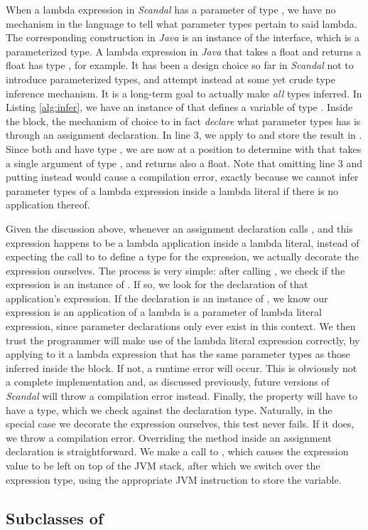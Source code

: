 When a lambda expression in \emph{Scandal} has a parameter of type , we have no mechanism in the language to tell what parameter types pertain to said lambda. The corresponding construction in \emph{Java} is an instance of the  interface, which is a parameterized type. A lambda expression in \emph{Java} that takes a float and returns a float has type , for example. It has been a design choice so far in \emph{Scandal} not to introduce parameterized types, and attempt instead at some yet crude type inference mechanism. It is a long-term goal to actually make \emph{all} types inferred. In Listing \ref{alg:infer}, we have an instance of  that defines a variable  of type . Inside the block, the mechanism of choice to in fact \emph{declare} what parameter types  has is through an assignment declaration. In line 3, we apply  to  and store the result in . Since both  and  have type , we are now at a position to determine with that  takes a single argument of type , and returns also a float. Note that omitting line 3 and putting  instead would cause a compilation error, exactly because we cannot infer parameter types of a lambda expression inside a lambda literal if there is no application thereof.

Given the discussion above, whenever an assignment declaration calls , and this expression happens to be a lambda application inside a lambda literal, instead of expecting the call to  to define a type for the expression, we actually decorate the expression ourselves. The process is very simple: after calling , we check if the expression is an instance of . If so, we look for the declaration of that application's expression. If the declaration is an instance of , we know our expression is an application of a lambda is a parameter of lambda literal expression, since parameter declarations only ever exist in this context. We then trust the programmer will make use of the lambda literal expression correctly, by applying to it a lambda expression that has the same parameter types as those inferred inside the block. If not, a runtime error will occur. This is obviously not a complete implementation and, as discussed previously, future versions of \emph{Scandal} will throw a compilation error instead. Finally, the  property will have to have a type, which we check against the declaration type. Naturally, in the special case we decorate the expression ourselves, this test never fails. If it does, we throw a compilation error. Overriding the  method inside an assignment declaration is straightforward. We make a call to , which causes the expression value to be left on top of the JVM stack, after which we switch over the expression type, using the appropriate JVM instruction to store the variable.

\subsection{Subclasses of }